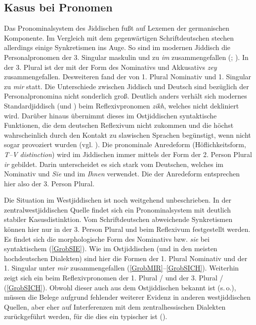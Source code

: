  \subsection{Kasus bei Pronomen}\label{kasuspron}
Das Pronominalsystem des Jiddischen fußt auf Lexemen der germanischen Komponente. Im Vergleich mit dem gegenwärtigen Schriftdeutschen stechen allerdings einige Synkretismen ins Auge. So sind im modernen Jiddisch die Personalpronomen der 3. Singular maskulin  und  zu  \textit{im} zusammengefallen (\cite[115]{Wolf1969}; \cite[185]{Jacobs2005}). In der 3. Plural ist der  mit der Form des Nominativs und Akkusativs  \textit{zey} zusammengefallen. Desweiteren fand der  von 1. Plural Nominativ und 1. Singular  zu  \textit{mir} statt. Die Unterschiede zwischen Jiddisch und Deutsch sind bezüglich der Personalpronomina nicht sonderlich groß. Deutlich anders verhält sich modernes Standardjiddisch (und ) beim Reflexivpronomen  \textit{zikh}, welches nicht dekliniert wird. Darüber hinaus übernimmt dieses  im Ostjiddischen syntaktische Funktionen, die dem deutschen Reflexivum nicht zukommen  und die höchst wahrscheinlich durch den Kontakt zu slawischen Sprachen begünstigt, wenn nicht sogar provoziert wurden (vgl. \cite[185]{Jacobs2005}). Die pronominale Anredeform (Höflichkeitsform, \textit{T–V distinction}) wird im Jiddischen immer mittels der Form der 2. Person Plural  \textit{ir} gebildet. Darin unterscheidet es sich stark vom Deutschen, welches im Nominativ und  \textit{Sie} und im  \textit{Ihnen} verwendet. Die  der Anredeform entsprechen hier also der 3. Person Plural.

Die Situation im Westjiddischen ist noch weitgehend unbeschrieben. In der zentralwestjiddischen Quelle  findet sich ein Pronominalsystem mit deutlich stabiler Kasusdistinktion. Vom Schriftdeutschen abweichende Synkretismen können hier nur in der 3. Person Plural und beim Reflexivum festgestellt werden. Es findet sich die morphologische Form des Nominativs bzw.   \textit{sie} bei syntaktischem  (\ref{GrobSIE}). Wie im Ostjiddischen (und in den meisten hochdeutschen Dialekten) sind hier die Formen der 1. Plural Nominativ und der 1. Singular  unter \textit{mir} zusammengefallen (\ref{GrobMIR}–\ref{GrobSICH}). Weiterhin zeigt sich ein  beim Reflexivpronomen der 1. Plural / und der 3. Plural /  (\ref{GrobSICH}). Obwohl dieser  auch aus dem Ostjiddischen bekannt ist (s.\,o.), müssen die Belege aufgrund fehlender weiterer Evidenz in anderen westjiddischen Quellen, aber eher auf Interferenzen mit dem zentralhessischen Dialekten zurückgeführt werden, für die dies ein typischer  ist (\cite[29]{Kehrein1860}). \\ 



